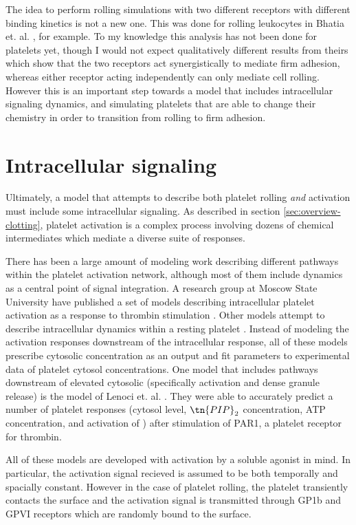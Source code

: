 The idea to perform rolling simulations with two different receptors
with different binding kinetics is not a new one. This was done for
rolling leukocytes in Bhatia et. al. \cite{Bhatia2003}, for
example. To my knowledge this analysis has not been done for platelets
yet, though I would not expect qualitatively different results from
theirs which show that the two receptors act synergistically to
mediate firm adhesion, whereas either receptor acting independently
can only mediate cell rolling. However this is an important step
towards a model that includes intracellular signaling dynamics, and
simulating platelets that are able to change their chemistry in order
to transition from rolling to firm adhesion. 

\section{Intracellular signaling}
\label{sec:intr-sign}

Ultimately, a model that attempts to describe both platelet rolling
\emph{and} activation must include some intracellular signaling. As
described in section \ref{sec:overview-clotting}, platelet activation
is a complex process involving dozens of chemical intermediates which
mediate a diverse suite of responses.

There has been a large amount of modeling work describing different
pathways within the platelet activation network, although most of them
include \Ca dynamics as a central point of signal integration. A
research group at Moscow State University have published a set of
models describing intracellular platelet activation as a response to
thrombin stimulation \cite{Shakhidzhanov2015, Sveshnikova2015,
  Balabin2016, Sveshnikova2016}. Other models attempt to describe
intracellular \Ca dynamics within a resting platelet \cite{Purvis2008,
  Dolan2014}. Instead of modeling the activation responses downstream
of the intracellular \Ca response, all of these models prescribe
cytosolic \Ca concentration as an output and fit parameters to
experimental data of platelet cytosol \Ca concentrations. One model
that includes pathways downstream of elevated cytosolic \Ca
(specifically  activation and dense granule release)
is the model of Lenoci et. al. \cite{Lenoci2011}. They were able to
accurately predict a number of platelet responses (cytosol \Ca level,
$\tn{PIP}_2$ concentration, ATP concentration, and activation of
) after stimulation of PAR1, a platelet receptor for
thrombin.

All of these models are developed with activation by a soluble agonist
in mind. In particular, the activation signal recieved is assumed to
be both temporally and spacially constant. However in the case of
platelet rolling, the platelet transiently contacts the surface and
the activation signal is transmitted through GP1b and GPVI receptors
which are randomly bound to the surface. 

